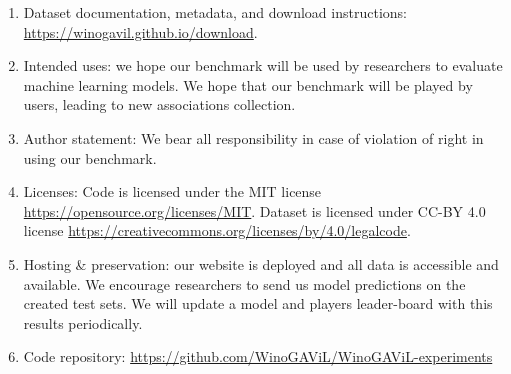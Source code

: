 \documentclass{article}
\begin{document}
\begin{enumerate}
  \item Dataset documentation, metadata, and download instructions: \url{https://winogavil.github.io/download}.
  \item Intended uses: we hope our benchmark will be used by researchers to evaluate machine learning models. We hope that our benchmark will be played by users, leading to new associations collection.
  \item Author statement: We bear all responsibility in case of violation of right in using our benchmark. 
  \item Licenses: Code is licensed under the MIT license \url{https://opensource.org/licenses/MIT}. Dataset is licensed under CC-BY 4.0 license \url{https://creativecommons.org/licenses/by/4.0/legalcode}.
  \item Hosting \& preservation: our website is deployed and all data is accessible and available. We encourage researchers to send us model predictions on the created test sets. We will update a model and players leader-board with this results periodically. 
  \item Code repository: \url{https://github.com/WinoGAViL/WinoGAViL-experiments}
\end{enumerate}
 
\end{document}

